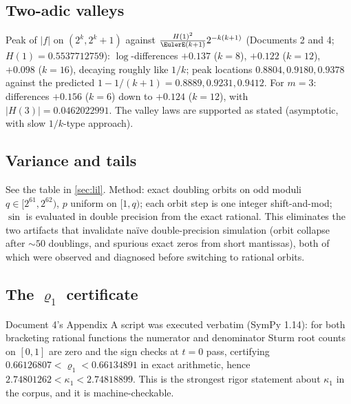 \documentclass[11pt,oneside]{article}
\theoremstyle{definition}
\theoremstyle{remark}
\begin{document}
\subsection{Two-adic valleys}
\label{ssec:valleys}

Peak of $|f|$ on $(2^k,2^k+1)$ against
$\frac{H(1)^2}{\EulerE(k+1)}2^{-k(k+1)}$
(Documents 2 and 4; $H(1)=0.5537712759$):
$\log$-differences $+0.137$ ($k=8$), $+0.122$ ($k=12$), $+0.098$
($k=16$), decaying roughly like $1/k$; peak locations
$0.8804,0.9180,0.9378$ against the predicted $1-1/(k+1)=
0.8889,0.9231,0.9412$.  For $m=3$: differences $+0.156$ ($k=6$) down to
$+0.124$ ($k=12$), with $|H(3)|=0.0462022991$.  The valley laws are
supported as stated (asymptotic, with slow $1/k$-type approach).

\subsection{Variance and tails}
\label{ssec:variance}

See the table in \cref{sec:lil}.  Method: exact doubling orbits on odd
moduli $q\in[2^{61},2^{62})$, $p$ uniform on $[1,q)$; each orbit step is
one integer shift-and-mod; $\sin$ is evaluated in double precision from
the exact rational.  This eliminates the two artifacts that invalidate
na\"ive double-precision simulation (orbit collapse after $\sim50$
doublings, and spurious exact zeros from short mantissas), both of which
were observed and diagnosed before switching to rational orbits.

\subsection{The $\varrho_1$ certificate}
\label{ssec:certificate}

Document 4's Appendix A script was executed verbatim (SymPy 1.14):
for both bracketing rational functions the numerator and denominator
Sturm root counts on $[0,1]$ are zero and the sign checks at $t=0$ pass,
certifying $0.66126807<\varrho_1<0.66134891$ in exact arithmetic,
hence $2.74801262<\kappa_1<2.74818899$.  This is the strongest
rigor statement about $\kappa_1$ in the corpus, and it is machine-checkable.
\end{document}
